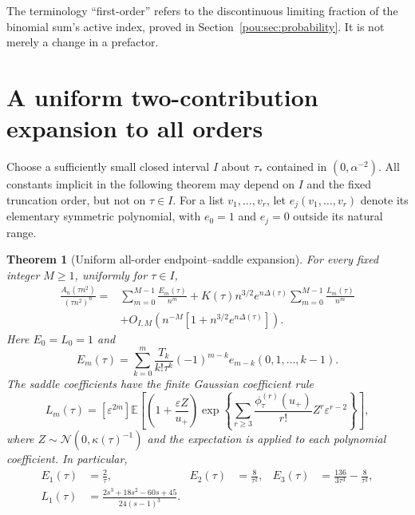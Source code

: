 \documentclass[11pt]{article}
\newtheorem{theorem}{Theorem}[section]
\theoremstyle{definition}
\theoremstyle{remark}
\newcommand{\E}{\mathbb E}
\newcommand{\Normal}{\mathcal N}
\newcommand{\eps}{\varepsilon}
\begin{document}
The terminology ``first-order'' refers to the discontinuous limiting
fraction of the binomial sum's active index, proved in
Section~\ref{pou:sec:probability}.  It is not merely a change in a prefactor.

\section{A uniform two-contribution expansion to all orders}\label{pou:sec:uniform}

Choose a sufficiently small closed interval $I$ about $\tau_*$ contained
in $(0,\alpha^{-2})$.  All constants implicit in the following theorem may
depend on $I$ and the fixed truncation order, but not on $\tau\in I$.
For a list $v_1,\ldots,v_r$, let $e_j(v_1,\ldots,v_r)$ denote its elementary
symmetric polynomial, with $e_0=1$ and $e_j=0$ outside its natural range.

\begin{theorem}[Uniform all-order endpoint--saddle expansion]
\label{pou:thm:uniform}
For every fixed integer $M\ge1$, uniformly for $\tau\in I$,
\begin{align}
 \frac{A_n(\tau n^2)}{(\tau n^2)^n}
 ={}&\sum_{m=0}^{M-1}\frac{E_m(\tau)}{n^m}
 +K(\tau)n^{3/2}e^{n\Delta(\tau)}
     \sum_{m=0}^{M-1}\frac{L_m(\tau)}{n^m}\nonumber\\
 &+O_{I,M}\!\left(n^{-M}
       \left[1+n^{3/2}e^{n\Delta(\tau)}\right]\right).
 \label{pou:eq:uniform}
\end{align}
Here $E_0=L_0=1$ and
\begin{equation}\label{pou:eq:Ecoeff}
 E_m(\tau)=\sum_{k=0}^{m}
 \frac{T_k}{k!\tau^k}(-1)^{m-k}
 e_{m-k}(0,1,\ldots,k-1).
\end{equation}
The saddle coefficients have the finite Gaussian coefficient rule
\begin{equation}\label{pou:eq:Lcoeff}
 L_m(\tau)=[\eps^{2m}]\E\left[
 \left(1+\frac{\eps Z}{u_+}\right)
 \exp\left\{\sum_{r\ge3}\frac{\phi_\tau^{(r)}(u_+)}{r!}
                  Z^r\eps^{r-2}\right\}\right],
\end{equation}
where $Z\sim\Normal(0,\kappa(\tau)^{-1})$ and the expectation is applied
to each polynomial coefficient.  In particular,
\begin{align}
 E_1(\tau)&=\frac2\tau,&E_2(\tau)&=\frac8{\tau^2},&
 E_3(\tau)&=\frac{136}{3\tau^3}-\frac8{\tau^2},\label{pou:eq:Es}\\
 L_1(\tau)&=\frac{2s^3+18s^2-60s+45}{24(s-1)^3}.
 \label{pou:eq:Lone}
\end{align}
\end{theorem}
\end{document}

